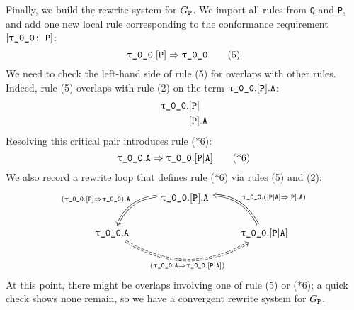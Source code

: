 \documentclass[../generics]{subfiles}
\begin{document}
\begin{example}
Finally, we build the rewrite system for $G_{\texttt{P}}$. We import all rules from \texttt{Q} and \texttt{P}, and add one new local rule corresponding to the conformance requirement $\ConfReq{\ttgp{0}{0}}{P}$:
\[
\ProtoConf{\ttgp{0}{0}}{P}\tag{5}
\]
We need to check the left-hand side of rule (5) for overlaps with other rules. Indeed, rule (5) overlaps with rule (2) on the term 
$\ttgp{0}{0}.\protosym{P}.\texttt{A}$:
\begin{align*}
\ttgp{0}{0}.&\protosym{P}\\
&\protosym{P}.\texttt{A}
\end{align*}
Resolving this critical pair introduces rule (*6):
\[
\ttgp{0}{0}.\texttt{A}\Rightarrow\ttgp{0}{0}.\assocsym{P}{A}\tag{*6}
\]
We also record a rewrite loop that defines rule (*6) via rules (5) and (2):
\[
\begin{tikzcd}
&\ttgp{0}{0}.\protosym{P}.\texttt{A}\arrow[ld, Rightarrow, "(\ProtoConf{\ttgp{0}{0}}{P}).\texttt{A}"', bend right]\\
\ttgp{0}{0}.\texttt{A}\arrow[rr, Rightarrow, "(\ttgp{0}{0}.\texttt{A}\Rightarrow\ttgp{0}{0}.\assocsym{P}{A})"', bend right, dashed]&&
\ttgp{0}{0}.\assocsym{P}{A}\arrow[ul, Rightarrow, "\ttgp{0}{0}.(\AssocIntroInv{P}{A})"', bend right]
\end{tikzcd}
\]
At this point, there might be overlaps involving one of rule (5) or (*6); a quick check shows none remain, so we have a convergent rewrite system for $G_{\texttt{P}}$.


\end{example}
\end{document}
